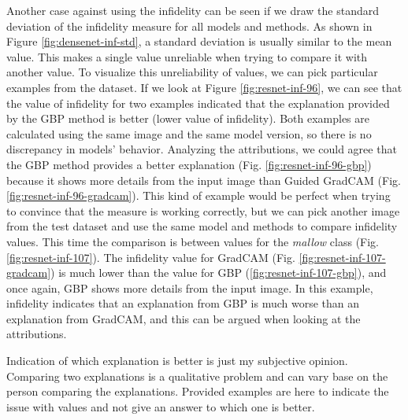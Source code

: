 Another case against using the infidelity can be seen if we draw the standard deviation of the infidelity measure for all models and methods. As shown in Figure \ref{fig:densenet-inf-std}, a standard deviation is usually similar to the mean value. This makes a single value unreliable when trying to compare it with another value. To visualize this unreliability of values, we can pick particular examples from the dataset. If we look at Figure \ref{fig:resnet-inf-96}, we can see that the value of infidelity for two examples indicated that the explanation provided by the GBP method is better (lower value of infidelity). Both examples are calculated using the same image and the same model version, so there is no discrepancy in models' behavior. Analyzing the attributions, we could agree that the GBP method provides a better explanation (Fig. \ref{fig:resnet-inf-96-gbp}) because it shows more details from the input image than Guided GradCAM (Fig. \ref{fig:resnet-inf-96-gradcam}). This kind of example would be perfect when trying to convince that the measure is working correctly, but we can pick another image from the test dataset and use the same model and methods to compare infidelity values. This time the comparison is between values for the \textit{mallow} class (Fig. \ref{fig:resnet-inf-107}). The infidelity value for GradCAM (Fig. \ref{fig:resnet-inf-107-gradcam}) is much lower than the value for GBP (\ref{fig:resnet-inf-107-gbp}), and once again, GBP shows more details from the input image. In this example, infidelity indicates that an explanation from GBP is much worse than an explanation from GradCAM, and this can be argued when looking at the attributions.

\begin{remark}
Indication of which explanation is better is just my subjective opinion. Comparing two explanations is a qualitative problem and can vary base on the person comparing the explanations. Provided examples are here to indicate the issue with values and not give an answer to which one is better.
\end{remark}


